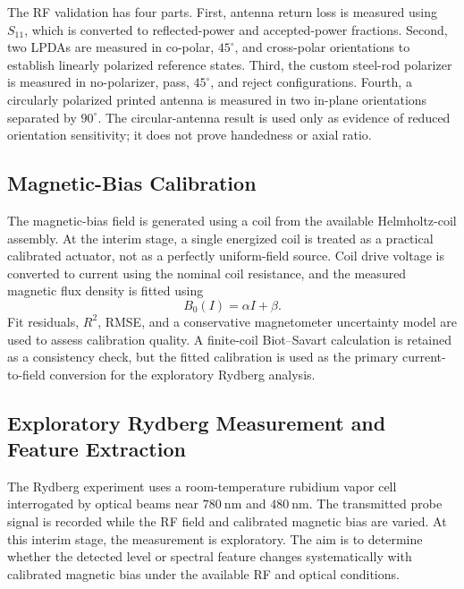 \documentclass{ieeeaccess}
\begin{document}
The RF validation has four parts. First, antenna return loss is measured using \(S_{11}\), which is converted to reflected-power and accepted-power fractions. Second, two LPDAs are measured in co-polar, \(45^\circ\), and cross-polar orientations to establish linearly polarized reference states. Third, the custom steel-rod polarizer is measured in no-polarizer, pass, \(45^\circ\), and reject configurations. Fourth, a circularly polarized printed antenna is measured in two in-plane orientations separated by \(90^\circ\). The circular-antenna result is used only as evidence of reduced orientation sensitivity; it does not prove handedness or axial ratio.

\subsection{Magnetic-Bias Calibration}
\label{subsec:method_magnetic_calibration}

The magnetic-bias field is generated using a coil from the available Helmholtz-coil assembly. At the interim stage, a single energized coil is treated as a practical calibrated actuator, not as a perfectly uniform-field source. Coil drive voltage is converted to current using the nominal coil resistance, and the measured magnetic flux density is fitted using
\begin{equation}
B_0(I)=\alpha I+\beta.
\label{eq:method_b_calibration}
\end{equation}
Fit residuals, \(R^2\), RMSE, and a conservative magnetometer uncertainty model are used to assess calibration quality. A finite-coil Biot--Savart calculation is retained as a consistency check, but the fitted calibration is used as the primary current-to-field conversion for the exploratory Rydberg analysis.

\subsection{Exploratory Rydberg Measurement and Feature Extraction}
\label{subsec:method_rydberg_feature}

The Rydberg experiment uses a room-temperature rubidium vapor cell interrogated by optical beams near \(780~\mathrm{nm}\) and \(480~\mathrm{nm}\). The transmitted probe signal is recorded while the RF field and calibrated magnetic bias are varied. At this interim stage, the measurement is exploratory. The aim is to determine whether the detected level or spectral feature changes systematically with calibrated magnetic bias under the available RF and optical conditions.
\end{document}
